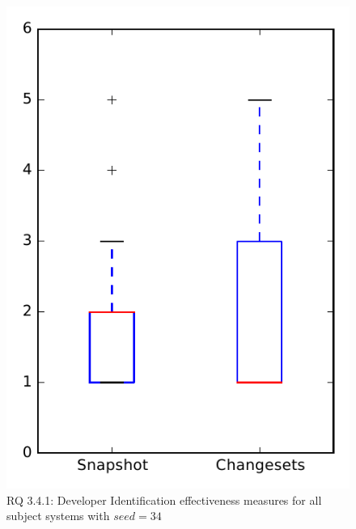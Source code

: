 
\begin{figure}
\centering
\includegraphics[height=0.4\textheight]{figures/dit_seed/rq1_overview_34}
\caption{RQ 3.4.1: Developer Identification effectiveness measures for all subject systems with $seed=34$}
\label{fig:dit_seed:rq1:overview}
\end{figure}
